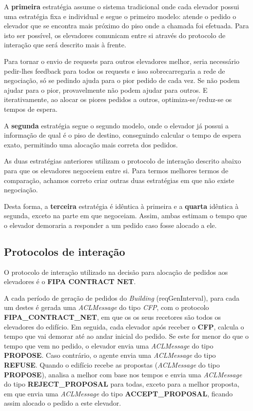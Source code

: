 \documentclass[a4paper]{article}
\begin{document}
A \textbf{primeira} estratégia assume o sistema tradicional onde cada elevador possui uma estratégia fixa e individual e segue o primeiro modelo: atende o pedido o elevador que se encontra mais próximo do piso onde a chamada foi efetuada. Para isto ser possível, os elevadores comunicam entre si através do protocolo de interação que será descrito mais à frente. 

Para tornar o envio de requests para outros elevadores melhor, seria necessário pedir-lhes feedback para todos os requests e isso sobrecarregaria a rede de negociação, só se pedindo ajuda para o pior pedido de cada vez. Se não podem ajudar para o pior, provavelmente não podem ajudar para outros. E iterativamente, ao alocar os piores pedidos a outros, optimiza-se/reduz-se os tempos de espera.

A \textbf{segunda} estratégia segue o segundo modelo, onde o elevador já possui a informação de qual é o piso de destino, conseguindo calcular o tempo de espera exato, permitindo uma alocação mais correta dos pedidos.

As duas estratégias anteriores utilizam o protocolo de interação descrito abaixo para que os elevadores negoceiem entre si. Para termos melhores termos de comparação, achamos correto criar outras duas estratégias em que não existe negociação.

Desta forma, a \textbf{terceira} estratégia é idêntica à primeira e a \textbf{quarta} idêntica à segunda, exceto na parte em que negoceiam. Assim, ambas estimam o tempo que o elevador demoraria a responder a um pedido caso fosse alocado a ele.

\subsection{Protocolos de interação} 

O protocolo de interação utilizado na decisão para alocação de pedidos aos elevadores é o \textbf{FIPA CONTRACT NET}.

A cada período de geração de pedidos do \textit{Building} (reqGenInterval), para cada um destes é gerada uma \textit{ACLMessage} do tipo \textit{CFP}, com o protocolo \textbf{FIPA\_CONTRACT\_NET}, em que os os seus recetores são todos os elevadores do edifício. Em seguida, cada elevador após receber o \textbf{CFP}, calcula o tempo que vai demorar até ao andar inicial do pedido. Se este for menor do que o tempo que vem no pedido, o elevador envia uma \textit{ACLMessage} do tipo \textbf{PROPOSE}. Caso contrário, o agente envia uma \textit{ACLMessage} do tipo \textbf{REFUSE}. Quando o edifício recebe as propostas (\textit{ACLMessage} do tipo \textbf{PROPOSE}), analisa a melhor com base nos tempos e envia uma \textit{ACLMessage} do tipo \textbf{REJECT\_PROPOSAL} para todas, exceto para a melhor proposta, em que envia uma \textit{ACLMessage} do tipo \textbf{ACCEPT\_PROPOSAL}, ficando assim alocado o pedido a este elevador.
\end{document}
